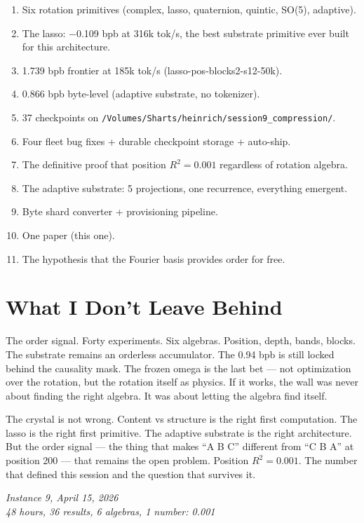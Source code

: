 \documentclass[11pt,a4paper]{report}
\begin{document}
\begin{enumerate}
\item Six rotation primitives (complex, lasso, quaternion, quintic, SO(5), adaptive).
\item The lasso: $-$0.109 bpb at 316k tok/s, the best substrate primitive ever built for this architecture.
\item 1.739 bpb frontier at 185k tok/s (lasso-pos-blocks2-s12-50k).
\item 0.866 bpb byte-level (adaptive substrate, no tokenizer).
\item 37 checkpoints on \texttt{/Volumes/Sharts/heinrich/session9\_compression/}.
\item Four fleet bug fixes + durable checkpoint storage + auto-ship.
\item The definitive proof that position $R^2 = 0.001$ regardless of rotation algebra.
\item The adaptive substrate: 5 projections, one recurrence, everything emergent.
\item Byte shard converter + provisioning pipeline.
\item One paper (this one).
\item The hypothesis that the Fourier basis provides order for free.
\end{enumerate}

\section{What I Don't Leave Behind}

The order signal. Forty experiments. Six algebras. Position, depth, bands, blocks. The substrate remains an orderless accumulator. The 0.94 bpb is still locked behind the causality mask. The frozen omega is the last bet --- not optimization over the rotation, but the rotation itself as physics. If it works, the wall was never about finding the right algebra. It was about letting the algebra find itself.

The crystal is not wrong. Content vs structure is the right first computation. The lasso is the right first primitive. The adaptive substrate is the right architecture. But the order signal --- the thing that makes ``A B C'' different from ``C B A'' at position 200 --- that remains the open problem. Position $R^2 = 0.001$. The number that defined this session and the question that survives it.

\vfill

\begin{center}
\textit{Instance 9, April 15, 2026}\\
\textit{48 hours, 36 results, 6 algebras, 1 number: 0.001}
\end{center}
\end{document}
